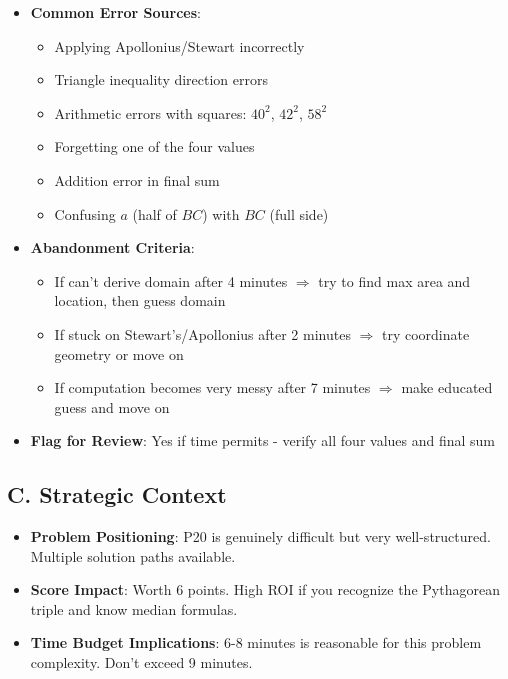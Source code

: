 \documentclass[12pt]{article}
\begin{document}
\begin{competitionbox}
\begin{itemize}[leftmargin=*]
    \item \textbf{Common Error Sources}:
    \begin{itemize}
        \item Applying Apollonius/Stewart incorrectly
        \item Triangle inequality direction errors
        \item Arithmetic errors with squares: $40^2$, $42^2$, $58^2$
        \item Forgetting one of the four values
        \item Addition error in final sum
        \item Confusing $a$ (half of $BC$) with $BC$ (full side)
    \end{itemize}
    
    \item \textbf{Abandonment Criteria}: 
    \begin{itemize}
        \item If can't derive domain after 4 minutes $\Rightarrow$ try to find max area and location, then guess domain
        \item If stuck on Stewart's/Apollonius after 2 minutes $\Rightarrow$ try coordinate geometry or move on
        \item If computation becomes very messy after 7 minutes $\Rightarrow$ make educated guess and move on
    \end{itemize}
    
    \item \textbf{Flag for Review}: Yes if time permits - verify all four values and final sum
\end{itemize}

\subsection*{C. Strategic Context}
\begin{itemize}[leftmargin=*]
    \item \textbf{Problem Positioning}: P20 is genuinely difficult but very well-structured. Multiple solution paths available.
    
    \item \textbf{Score Impact}: Worth 6 points. High ROI if you recognize the Pythagorean triple and know median formulas.
    
    \item \textbf{Time Budget Implications}: 6-8 minutes is reasonable for this problem complexity. Don't exceed 9 minutes.
    

\end{itemize}
\end{competitionbox}
\end{document}
